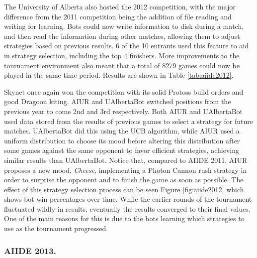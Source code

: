 \documentclass{llncs}
\begin{document}
The University of Alberta also hosted the 2012 competition, with the major difference from the 2011
competition being the addition of file reading and writing for learning. Bots could now write information to disk during a
match, and then read the information during other matches, allowing them to adjust strategies based
on previous results. 6 of the 10 entrants used this feature to aid in strategy selection, including the
top 4 finishers. More improvements to the tournament environment also meant that a total of 8279 games
could now be played in the same time period. Results are shown in Table \ref{tab:aiide2012}.

Skynet once  again won  the competition with  its solid  Protoss build
orders  and  good  Dragoon  kiting.   AIUR  and  UAlbertaBot  switched
positions from  the previous  year to come  2nd and  3rd respectively.
Both  AIUR  and UAlbertaBot  used  data  stored  from the  results  of
previous games  to select a strategy for  future matches.  UAlbertaBot
did  this  using  the  UCB  \cite{auer2002finite} algorithm,  while  AIUR  used  a  uniform
distribution  to choose  its  mood before  altering this  distribution
after  some  games  against  the  same  opponent  to  favor  efficient
strategies, achieving  similar results than  UAlbertaBot. Notice that,
compared  to AIIDE 2011,  AIUR proposes  a new  mood, \textit{Cheese},
implementing a  Photon Cannon rush  strategy in order to  surprise the
opponent and  to finish the game  as soon as possible.   The effect of
this strategy selection process can be seen Figure \ref{fig:aiide2012}
which shows bot  win percentages over time.  While  the earlier rounds
of the tournament fluctuated wildly in results, eventually the results
converged to their  final values. One of the main  reasons for this is
due to  the bots  learning which strategies  to use as  the tournament
progressed.

\subsubsection*{AIIDE 2013.}
\end{document}
